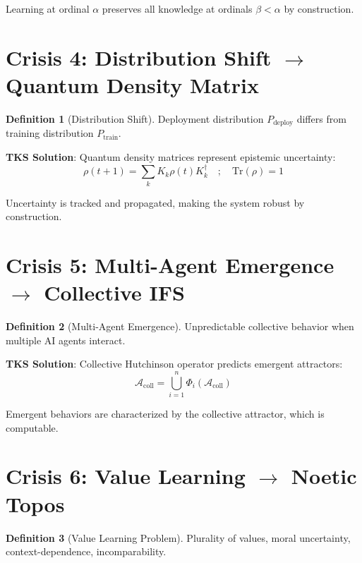 \documentclass[11pt,twoside]{book}
\theoremstyle{definition}
\newtheorem{definition}{Definition}[chapter]
\theoremstyle{plain}
\theoremstyle{remark}
\newcommand{\Frac}{\Phi}
\newcommand{\DensityMat}{\rho}
\newcommand{\Trace}{\mathrm{Tr}}
\begin{document}
Learning at ordinal $\alpha$ preserves all knowledge at ordinals $\beta < \alpha$ by construction.

\section{Crisis 4: Distribution Shift $\to$ Quantum Density Matrix}

\begin{definition}[Distribution Shift]
Deployment distribution $P_{\mathrm{deploy}}$ differs from training distribution $P_{\mathrm{train}}$.
\end{definition}

\textbf{TKS Solution}: Quantum density matrices represent epistemic uncertainty:
\begin{equation}
\boxed{
    \DensityMat(t+1) = \sum_k K_k \DensityMat(t) K_k^\dagger \quad ; \quad \Trace(\DensityMat) = 1
}
\end{equation}

Uncertainty is tracked and propagated, making the system robust by construction.

\section{Crisis 5: Multi-Agent Emergence $\to$ Collective IFS}

\begin{definition}[Multi-Agent Emergence]
Unpredictable collective behavior when multiple AI agents interact.
\end{definition}

\textbf{TKS Solution}: Collective Hutchinson operator predicts emergent attractors:
\begin{equation}
\boxed{
    \mathcal{A}_{\mathrm{coll}} = \bigcup_{i=1}^{n} \Frac_i(\mathcal{A}_{\mathrm{coll}})
}
\end{equation}

Emergent behaviors are characterized by the collective attractor, which is computable.

\section{Crisis 6: Value Learning $\to$ Noetic Topos}

\begin{definition}[Value Learning Problem]
Plurality of values, moral uncertainty, context-dependence, incomparability.
\end{definition}
\end{document}
